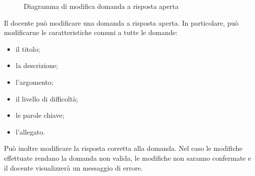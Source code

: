 \documentclass[a4paper, titlepage]{article}
\begin{document}
\newpage
{}
\begin{figure}[H]
	\centering
	\noindent{}
	\caption{Diagramma di modifica domanda a risposta aperta}
\end{figure}
Il docente può modificare una domanda a risposta aperta. In particolare, può modificarne le caratteristiche comuni a tutte le domande:
\begin{itemize}
	\item il titolo; 
	\item la descrizione;
	\item l’argomento;
	\item il livello di difficoltà; 
	\item le parole chiave;
	\item l’allegato.
\end{itemize}
Può inoltre modificare la risposta corretta alla domanda.
Nel caso le modifiche effettuate rendano la domanda non valida, le modifiche non saranno confermate e il docente visualizzerà un messaggio di errore.
\end{document}
